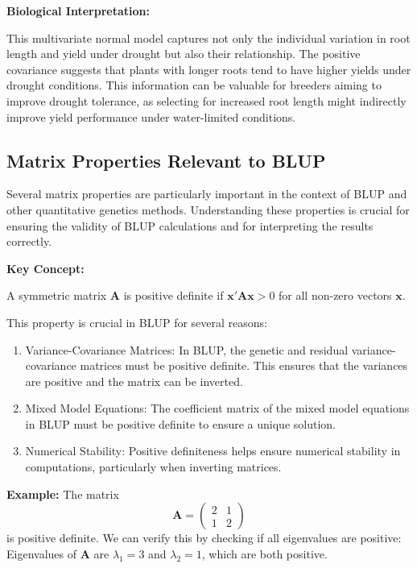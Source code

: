 \documentclass[12pt,a4paper]{article}
\newenvironment{keyconceptbox}[1][]
{\begin{basebox}[linecolor=uqblue]
\textbf{\color{uqblue}Key Concept:} \textit{#1}\par\noindent\ignorespaces}
{\end{basebox}}
\newenvironment{interpretation}[1][]
{\begin{basebox}[linecolor=uqgreen]
\textbf{\color{uqgreen}Biological Interpretation:} \textit{#1}\par\noindent\ignorespaces}
{\end{basebox}}
\begin{document}
\begin{interpretation}
This multivariate normal model captures not only the individual variation in root length and yield under drought but also their relationship. The positive covariance suggests that plants with longer roots tend to have higher yields under drought conditions. This information can be valuable for breeders aiming to improve drought tolerance, as selecting for increased root length might indirectly improve yield performance under water-limited conditions.
\end{interpretation}

\subsection{Matrix Properties Relevant to BLUP}

Several matrix properties are particularly important in the context of BLUP and other quantitative genetics methods. Understanding these properties is crucial for ensuring the validity of BLUP calculations and for interpreting the results correctly.

\begin{keyconceptbox}

A symmetric matrix $\mathbf{A}$ is positive definite if $\mathbf{x}'\mathbf{A}\mathbf{x} > 0$ for all non-zero vectors $\mathbf{x}$. 
\end{keyconceptbox}

This property is crucial in BLUP for several reasons:

\begin{enumerate}
    \item Variance-Covariance Matrices: In BLUP, the genetic and residual variance-covariance matrices must be positive definite. This ensures that the variances are positive and the matrix can be inverted.
    \item Mixed Model Equations: The coefficient matrix of the mixed model equations in BLUP must be positive definite to ensure a unique solution.
    \item Numerical Stability: Positive definiteness helps ensure numerical stability in computations, particularly when inverting matrices.
\end{enumerate}

\textbf{Example:}
The matrix $$\mathbf{A} = \begin{pmatrix} 2 & 1 \\ 1 & 2 \end{pmatrix}$$ is positive definite.
We can verify this by checking if all eigenvalues are positive:
Eigenvalues of $\mathbf{A}$ are $\lambda_1 = 3$ and $\lambda_2 = 1$, which are both positive.
\end{document}

